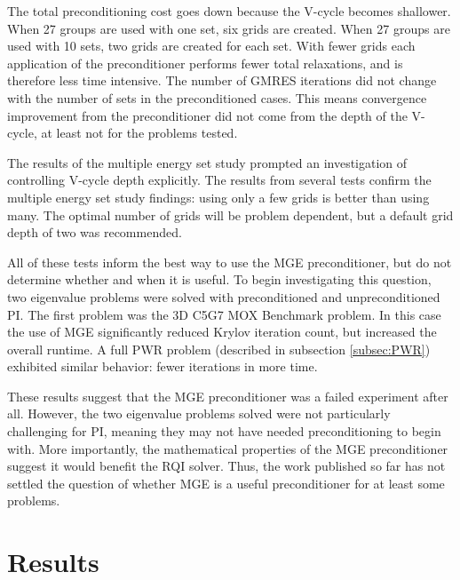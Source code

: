 \documentclass[preprint,12pt]{elsarticle}
\begin{document}
The total preconditioning cost goes down because the V-cycle becomes shallower. When 27 groups are used with one set, six grids are created. When 27 groups are used with 10 sets, two grids are created for each set. With fewer grids each application of the preconditioner performs fewer total relaxations, and is therefore less time intensive. The number of GMRES iterations did not change with the number of sets in the preconditioned cases. This means convergence improvement from the preconditioner did not come from the depth of the V-cycle, at least not for the problems tested.

The results of the multiple energy set study prompted an investigation of controlling V-cycle depth explicitly. The results from several tests confirm the multiple energy set study findings: using only a few grids is better than using many. The optimal number of grids will be problem dependent, but a default grid depth of two was recommended.

All of these tests inform the best way to use the MGE preconditioner, but do not determine whether and when it is useful. To begin investigating this question, two eigenvalue problems were solved with preconditioned and unpreconditioned PI. The first problem was the 3D C5G7 MOX Benchmark problem. In this case the use of MGE significantly reduced Krylov iteration count, but increased the overall runtime. A full PWR problem (described in subsection \ref{subsec:PWR}) exhibited similar behavior: fewer iterations in more time. 

These results suggest that the MGE preconditioner was a failed experiment after all. However, the two eigenvalue problems solved were not particularly challenging for PI, meaning they may not have needed preconditioning to begin with. More importantly, the mathematical properties of the MGE preconditioner suggest it would benefit the RQI solver. Thus, the work published so far has not settled the question of whether MGE is a useful preconditioner for at least some problems. 

\section{Results}
\label{sec:results}
\end{document}
